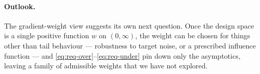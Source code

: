 \paragraph{Outlook.}
The gradient-weight view suggests its own next question. Once the design space
is a single positive function $w$ on $(0,\infty)$, the weight can be chosen for
things other than tail behaviour --- robustness to target noise, or a
prescribed influence function --- and \eqref{eq:req-over}--\eqref{eq:req-under}
pin down only the asymptotics, leaving a family of admissible weights that we
have not explored.
